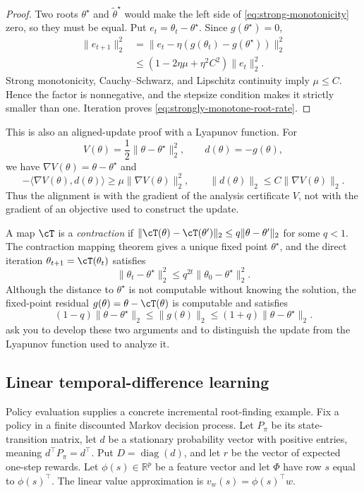 \documentclass[11pt,twoside]{article}
\newcommand{\R}{\mathbb R}
\newcommand{\diag}{\operatorname{diag}}
\theoremstyle{definition}
\theoremstyle{remark}
\begin{document}
\begin{proof}
Two roots $\theta^\star$ and $\widetilde\theta^\star$ would make the
left side of \cref{eq:strong-monotonicity} zero, so they must be equal. Put
$e_t=\theta_t-\theta^\star$. Since $g(\theta^\star)=0$,
\begin{align*}
 \|e_{t+1}\|_2^2
 &=\|e_t-\eta(g(\theta_t)-g(\theta^\star))\|_2^2\\
 &\le(1-2\eta\mu+\eta^2C^2)\|e_t\|_2^2.
\end{align*}
Strong monotonicity, Cauchy--Schwarz, and Lipschitz continuity imply
$\mu\le C$. Hence the factor is nonnegative, and the stepsize condition makes
it strictly smaller than one. Iteration proves
\cref{eq:strongly-monotone-root-rate}.
\end{proof}

This is also an aligned-update proof with a Lyapunov function. For
\[
 V(\theta)=\frac12\|\theta-\theta^\star\|_2^2,
 \qquad d(\theta)=-g(\theta),
\]
we have $\nabla V(\theta)=\theta-\theta^\star$ and
\[
 -\langle\nabla V(\theta),d(\theta)\rangle
 \ge\mu\|\nabla V(\theta)\|_2^2,
 \qquad
 \|d(\theta)\|_2\le C\|\nabla V(\theta)\|_2.
\]
Thus the alignment is with the gradient of the analysis certificate $V$, not
with the gradient of an objective used to construct the update.

A map $\cT$ is a \emph{contraction} if
$\|\cT(\theta)-\cT(\theta')\|_2\le q\|\theta-\theta'\|_2$ for some
$q<1$. The contraction mapping theorem gives a unique fixed point
$\theta^\star$, and the direct iteration
$\theta_{t+1}=\cT(\theta_t)$ satisfies
\[
 \|\theta_t-\theta^\star\|_2^2
 \le q^{2t}\|\theta_0-\theta^\star\|_2^2.
\]
Although the distance to $\theta^\star$ is not computable without knowing the
solution, the fixed-point residual
$g(\theta)=\theta-\cT(\theta)$ is computable and satisfies
\[
 (1-q)\|\theta-\theta^\star\|_2
 \le\|g(\theta)\|_2
 \le(1+q)\|\theta-\theta^\star\|_2.
\]
 ask you to develop these two
arguments and to distinguish the update from the Lyapunov function used to
analyze it.

\subsection{Linear temporal-difference learning}
\label{sec:linear-td}

Policy evaluation supplies a concrete incremental root-finding example.
Fix a policy in a finite discounted Markov decision process. Let $P_\pi$ be
its state-transition matrix, let $d$ be a stationary probability vector with
positive entries, meaning $d^\top P_\pi=d^\top$. Put $D=\diag(d)$, and let
$r$ be the vector of expected one-step rewards. Let $\phi(s)\in\R^p$ be a
feature vector and let
$\Phi$ have row $s$ equal to $\phi(s)^\top$. The linear value approximation
is $v_w(s)=\phi(s)^\top w$.
\end{document}
